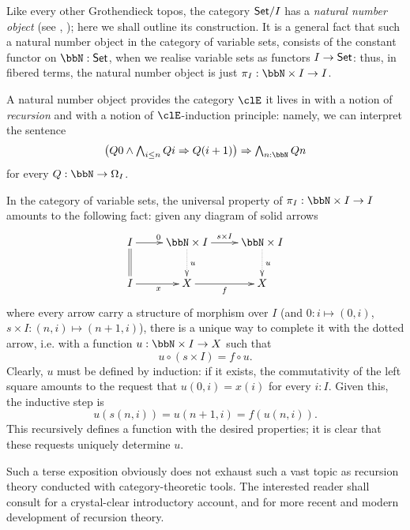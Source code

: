\begin{remark}
	Like every other Grothendieck topos, the category $\mathsf{Set}/I$ has a \emph{natural number object} (see \cite[VI.1]{mac1992sheaves}, \cite[p.46]{lambek1988introduction}); here we shall outline its construction. It is a general fact that such a natural number object in the category of variable sets, consists of the constant functor on $\bbN : \Set$, when we realise variable sets as functors $I \to \mathsf{Set}$: thus, in fibered terms, the natural number object is just $\pi_I : \bbN \times I \to I$.

	A natural number object provides the category $\clE$ it lives in with a notion of \emph{recursion} and with a notion of $\clE$-induction principle: namely, we can interpret the sentence
	\[\textstyle\big(Q0\land \bigwedge_{i\le n} Qi\Rightarrow Q(i+1)\big)\Rightarrow \bigwedge_{n : \bbN} Qn\]
	for every $Q : \bbN \to \Omega_I$.

	In the category of variable sets, the universal property of $\pi_I : \bbN\times I \to I$ amounts to the following fact: given any diagram of solid arrows
	\begin{equation}\label{natnumeq}
		\vcenter{\xymatrix{
				I \ar[r]^0 \ar@{=}[d] & \bbN\times I\ar@{.>}[d]^u \ar[r]^{s\times I} & \bbN \times I\ar@{.>}[d]^u \\
				I \ar[r]_x & X \ar[r]_f & X
			}}
	\end{equation}
	where every arrow carry a structure of morphism over $I$ (and $0 : i \mapsto (0,i)$, $s\times I : (n,i) \mapsto (n+1,i)$), there is a unique way to complete it with the dotted arrow, i.e. with a function $u : \bbN \times I \to X$ such that
	\[u \circ (s\times I) = f \circ u.\]
	Clearly, $u$ must be defined by induction: if it exists, the commutativity of the left square amounts to the request that $u(0,i)=x(i)$ for every $i : I$. Given this, the inductive step is
	\[
		u(s(n,i)) = u(n+1,i) = f(u(n,i)).
	\]
	This recursively defines a function with the desired properties; it is clear that these requests uniquely determine $u$.
\end{remark}
Such a terse exposition obviously does not exhaust such a vast topic as recursion theory conducted with category-theoretic tools. The interested reader shall consult \cite{jacobs1997tutorial} for a crystal-clear introductory account, and \cite{cockett2008introduction,cockett2014total} for more recent and modern development of recursion theory.

